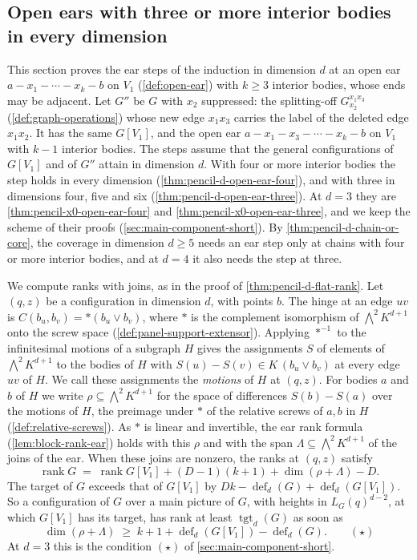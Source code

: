 \subsection{Open ears with three or more interior bodies in every dimension}
\label{sec:pencil-d-short}

This section proves the ear steps of the induction in dimension $d$ at
an open ear $a - x_1 - \cdots - x_k - b$ on $V_1$ (\cref{def:open-ear})
with $k \ge 3$ interior bodies, whose ends may be adjacent. Let $G''$ be
$G$ with $x_2$ suppressed: the splitting-off $G_{x_2}^{x_1 x_3}$
(\cref{def:graph-operations}) whose new edge $x_1 x_3$ carries the label
of the deleted edge $x_1 x_2$. It has the same $G[V_1]$, and the open ear
$a - x_1 - x_3 - \cdots - x_k - b$ on $V_1$ with $k - 1$ interior
bodies. The steps assume that the general configurations of $G[V_1]$ and
of $G''$ attain in dimension $d$. With four or more interior bodies the
step holds in every dimension (\cref{thm:pencil-d-open-ear-four}), and
with three in dimensions four, five and six
(\cref{thm:pencil-d-open-ear-three}). At $d = 3$ they are
\cref{thm:pencil-x0-open-ear-four} and
\cref{thm:pencil-x0-open-ear-three}, and we keep the scheme of their
proofs (\cref{sec:main-component-short}). By
\cref{thm:pencil-d-chain-or-core}, the coverage in dimension $d \ge 5$
needs an ear step only at chains with four or more interior bodies, and
at $d = 4$ it also needs the step at three.

We compute ranks with joins, as in the proof of
\cref{thm:pencil-d-flat-rank}. Let $(q, z)$ be a configuration in
dimension $d$, with points $b$. The hinge at an edge $uv$ is
$C(b_u, b_v) = *(b_u \vee b_v)$, where $*$ is the complement isomorphism
of $\bigwedge^2 K^{d+1}$ onto the screw space
(\cref{def:panel-support-extensor}). Applying $*^{-1}$ to the
infinitesimal motions of a subgraph $H$ gives the assignments $S$ of
elements of $\bigwedge^2 K^{d+1}$ to the bodies of $H$ with
$S(u) - S(v) \in K\,(b_u \vee b_v)$ at every edge $uv$ of $H$. We call
these assignments the \emph{motions} of $H$ at $(q, z)$. For bodies $a$
and $b$ of $H$ we write $\rho \subseteq \bigwedge^2 K^{d+1}$ for the
space of differences $S(b) - S(a)$ over the motions of $H$, the preimage
under $*$ of the relative screws of $a, b$ in $H$
(\cref{def:relative-screws}). As $*$ is linear and invertible, the ear
rank formula (\cref{lem:block-rank-ear}) holds with this $\rho$ and with
the span $\Lambda \subseteq \bigwedge^2 K^{d+1}$ of the joins of the
ear. When these joins are nonzero, the ranks at $(q, z)$ satisfy
\[
  \operatorname{rank} G \;=\; \operatorname{rank} G[V_1]
  + (D - 1)(k + 1) + \dim(\rho + \Lambda) - D.
\]
The target of $G$ exceeds that of $G[V_1]$ by
$Dk - \operatorname{def}_d(G) + \operatorname{def}_d(G[V_1])$. So a
configuration of $G$ over a main picture of $G$, with heights in
$L_G(q)^{d-2}$, at which $G[V_1]$ has its target, has rank at least
$\operatorname{tgt}_d(G)$ as soon as
\[
  \dim(\rho + \Lambda) \;\ge\; k + 1 + \operatorname{def}_d(G[V_1])
  - \operatorname{def}_d(G). \qquad (\star)
\]
At $d = 3$ this is the condition $(\star)$ of
\cref{sec:main-component-short}.

